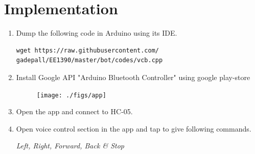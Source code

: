 \documentclass[journal,12pt,twocolumn]{IEEEtran}
\renewcommand\thesection{\arabic{section}}
\begin{document}
\section{Implementation}
\begin{enumerate}[label=\thesection.\arabic*
,ref=\thesection.\theenumi]
\item Dump the following code in Arduino using its IDE.
\begin{lstlisting}
wget https://raw.githubusercontent.com/ gadepall/EE1390/master/bot/codes/vcb.cpp
\end{lstlisting}
%
\item Install Google API "Arduino Bluetooth Controller" using google play-store
\begin{figure}[!h]
\begin{center}
\texttt{[image: ./figs/app]}
\end{center}
\caption{}
\label{fig:App}
\end{figure}
\item Open the app and connect to HC-05.
\item Open voice control section in the app and tap to give following commands. 

\textit{Left, Right, Forward, Back \& Stop}

\end{enumerate}
\end{document}
